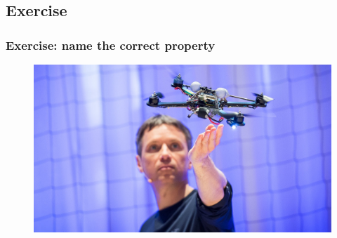 \subsection[Exercise]{Exercise}
\begin{frame}
	\frametitle{Exercise: name the correct property}
	\begin{figure}
\centering
\includegraphics[width=1\linewidth]{control-goals/quadcopter}
\label{fig:ted-drone}
\end{figure}

\end{frame}


